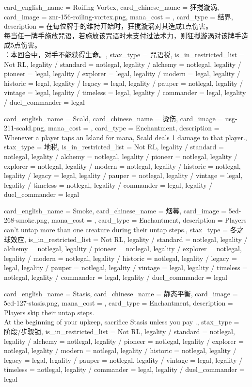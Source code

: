 \documentclass[lang = cn, color = black, 10pt]{AllThatStax}
\begin{document}
\card
{
	card_english_name = {Roiling Vortex},
	card_chinese_name = {狂搅漩涡},
	card_image = znr-156-roiling-vortex.png,
	mana_cost = ,
	card_type = 结界,
	description = {在每位牌手的维持开始时，狂搅漩涡对其造成1点伤害。\\
		每当任一牌手施放咒语，若施放该咒语时未支付过法术力，则狂搅漩涡对该牌手造成5点伤害。\\
		：本回合中，对手不能获得生命。},
	stax_type = 咒语税,
	is_in_restricted_list = Not RL,
	legality / standard = notlegal,
	legality / alchemy = notlegal,
	legality / pioneer = legal,
	legality / explorer = legal,
	legality / modern = legal,
	legality / historic = legal,
	legality / legacy = legal,
	legality / pauper = notlegal,
	legality / vintage = legal,
	legality / timeless = legal,
	legality / commander = legal,
	legality / duel_commander = legal
}

\card
{
	card_english_name = {Scald},
	card_chinese_name = {烫伤},
	card_image = usg-211-scald.png,
	mana_cost = ,
	card_type = Enchantment,
	description = {Whenever a player taps an Island for mana, Scald deals 1 damage to that player.},
	stax_type = 地税,
	is_in_restricted_list = Not RL,
	legality / standard = notlegal,
	legality / alchemy = notlegal,
	legality / pioneer = notlegal,
	legality / explorer = notlegal,
	legality / modern = notlegal,
	legality / historic = notlegal,
	legality / legacy = legal,
	legality / pauper = notlegal,
	legality / vintage = legal,
	legality / timeless = notlegal,
	legality / commander = legal,
	legality / duel_commander = legal
}

\card
{
	card_english_name = {Smoke},
	card_chinese_name = {烟幕},
	card_image = 5ed-268-smoke.png,
	mana_cost = ,
	card_type = Enchantment,
	description = {Players can't untap more than one creature during their untap steps.},
	stax_type = 冬之球效应,
	is_in_restricted_list = Not RL,
	legality / standard = notlegal,
	legality / alchemy = notlegal,
	legality / pioneer = notlegal,
	legality / explorer = notlegal,
	legality / modern = notlegal,
	legality / historic = notlegal,
	legality / legacy = legal,
	legality / pauper = notlegal,
	legality / vintage = legal,
	legality / timeless = notlegal,
	legality / commander = legal,
	legality / duel_commander = legal
}

\card
{
	card_english_name = {Stasis},
	card_chinese_name = {静态平衡},
	card_image = 5ed-127-stasis.png,
	mana_cost = ,
	card_type = Enchantment,
	description = {Players skip their untap steps.\\
		At the beginning of your upkeep, sacrifice Stasis unless you pay .},
	stax_type = 阶段/步骤锁,
	is_in_restricted_list = Not RL,
	legality / standard = notlegal,
	legality / alchemy = notlegal,
	legality / pioneer = notlegal,
	legality / explorer = notlegal,
	legality / modern = notlegal,
	legality / historic = notlegal,
	legality / legacy = legal,
	legality / pauper = notlegal,
	legality / vintage = legal,
	legality / timeless = notlegal,
	legality / commander = legal,
	legality / duel_commander = legal
}
\end{document}
